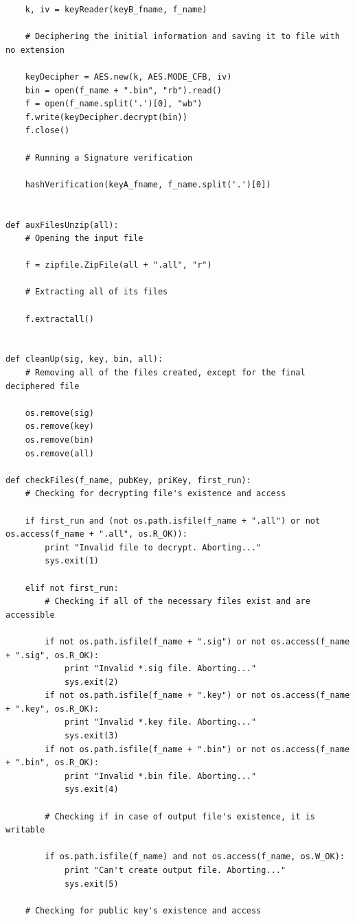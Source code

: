 \documentclass[a4paper,11pt,openright,oneside]{report}
\begin{document}
\begin{verbatim}
    k, iv = keyReader(keyB_fname, f_name)

    # Deciphering the initial information and saving it to file with no extension

    keyDecipher = AES.new(k, AES.MODE_CFB, iv)
    bin = open(f_name + ".bin", "rb").read()
    f = open(f_name.split('.')[0], "wb")
    f.write(keyDecipher.decrypt(bin))
    f.close()

    # Running a Signature verification

    hashVerification(keyA_fname, f_name.split('.')[0])


def auxFilesUnzip(all):
    # Opening the input file

    f = zipfile.ZipFile(all + ".all", "r")

    # Extracting all of its files

    f.extractall()


def cleanUp(sig, key, bin, all):
    # Removing all of the files created, except for the final deciphered file

    os.remove(sig)
    os.remove(key)
    os.remove(bin)
    os.remove(all)

def checkFiles(f_name, pubKey, priKey, first_run):
    # Checking for decrypting file's existence and access

    if first_run and (not os.path.isfile(f_name + ".all") or not os.access(f_name + ".all", os.R_OK)):
        print "Invalid file to decrypt. Aborting..."
        sys.exit(1)

    elif not first_run:
        # Checking if all of the necessary files exist and are accessible

        if not os.path.isfile(f_name + ".sig") or not os.access(f_name + ".sig", os.R_OK):
            print "Invalid *.sig file. Aborting..."
            sys.exit(2)
        if not os.path.isfile(f_name + ".key") or not os.access(f_name + ".key", os.R_OK):
            print "Invalid *.key file. Aborting..."
            sys.exit(3)
        if not os.path.isfile(f_name + ".bin") or not os.access(f_name + ".bin", os.R_OK):
            print "Invalid *.bin file. Aborting..."
            sys.exit(4)

        # Checking if in case of output file's existence, it is writable

        if os.path.isfile(f_name) and not os.access(f_name, os.W_OK):
            print "Can't create output file. Aborting..."
            sys.exit(5)

    # Checking for public key's existence and access


\end{verbatim}
\end{document}
